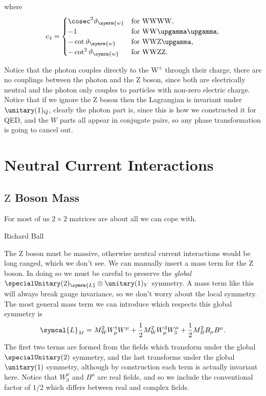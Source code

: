 \documentclass[fleqn]{NotesClass}
\newcommand{\Pparticle}[1]{\mathrm{#1}}
\newcommand{\Pphoton}{\ensuremath{\upgamma}}
\newcommand{\PZ}{\ensuremath{\Pparticle{Z}}}
\newcommand{\PW}{\ensuremath{\Pparticle{W}}}
\newcommand{\PWpm}{\ensuremath{\Pparticle{W}^{\pm}}}
\newcommand{\hermit}{\dagger}
\newcommand{\lagrangianDensity}{\symcal{L}}
\newcommand{\Left}{\symrm{L}}
\newcommand{\weinbergangle}{\vartheta_{\symrm{w}}}
\begin{document}
    where
    \begin{equation}
        c_4 = 
        \begin{cases}
            \cosec^2\weinbergangle & \text{for \PW\PW\PW\PW},\\
            -1 & \text{for \PW\PW\Pphoton\Pphoton},\\
            -\cot\weinbergangle & \text{for \PW\PW\PZ\Pphoton},\\
            -\cot^2\weinbergangle & \text{for \PW\PW\PZ\PZ}.
        \end{cases}
    \end{equation}
    
    Notice that the photon couples directly to the \(\PWpm\) through their charge, there are no couplings between the photon and the \PZ{} boson, since both are electrically neutral and the photon only couples to particles with non-zero electric charge.
    Notice that if we ignore the \PZ{} boson then the Lagrangian is invariant under \(\unitary(1)_Q\), clearly the photon part is, since this is how we constructed it for QED, and the \(W\) parts all appear in conjugate pairs, so any phase transformation is going to cancel out.
    
    \chapter{Neutral Current Interactions}
    \section{\texorpdfstring{\PZ}{Z} Boson Mass}
    \epigraph{For most of us \(2\times 2\) matrices are about all we can cope with.}{Richard Ball}
    The \PZ{} boson must be massive, otherwise neutral current interactions would be long ranged, which we don't see.
    We can manually insert a mass term for the \PZ{} boson.
    In doing so we must be careful to preserve the \emph{global} \(\specialUnitary(2)_{\Left} \otimes \unitary(1)_Y\) symmetry.
    A mass term like this will always break gauge invariance, so we don't worry about the local symmetry.
    The most general mass term we can introduce which respects this global symmetry is
    \begin{equation}
        \lagrangianDensity_{M} = M_{\PW}^2 W_\mu^\hermit W^\mu + \frac{1}{2}M_{\PW}^2 W^3_\mu W_3^\mu + \frac{1}{2}M_B^2 B_\mu B^\mu.
    \end{equation}
    The first two terms are formed from the fields which transform under the global \(\specialUnitary(2)\) symmetry, and the last transforms under the global \(\unitary(1)\) symmetry, although by construction each term is actually invariant here.
    Notice that \(W_3^\mu\) and \(B^\mu\) are real fields, and so we include the conventional factor of \(1/2\) which differs between real and complex fields.
    
\end{document}
